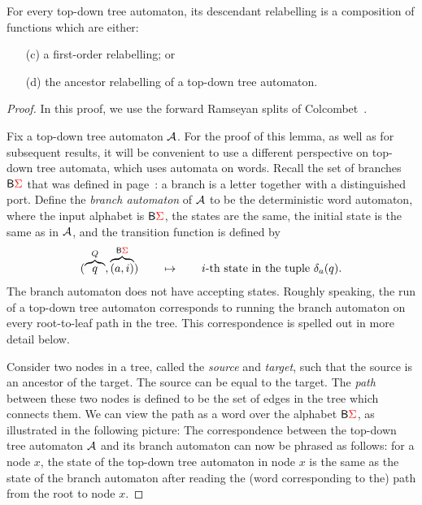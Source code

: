 \begin{lemma}\label{lem:reduce-descendant-to-ancestor}
    For every top-down tree automaton, its descendant relabelling is  a composition of functions which are either:
    \begin{itemize}
        \item[(c)] a first-order relabelling; or 
        \item[(d)] the ancestor relabelling of a  top-down tree automaton.
    \end{itemize}
\end{lemma}
\begin{proof} In this proof, we use the forward Ramseyan splits  of Colcombet~\cite{colcombetCombinatorialTheoremTrees2007}.

    Fix a top-down tree automaton ${\mathcal A}$. 
      For the proof of this lemma, as well as for subsequent results, it will be convenient to use a different perspective on top-down tree automata, which uses automata on words. Recall the set of branches $\mathsf{B} {\color{red}{\Sigma}}$ that was defined in page~\pageref{page:branches}: a branch is a letter together with a distinguished port. Define the \emph{branch automaton} of ${\mathcal A}$ to be the deterministic word automaton, where the input alphabet is $\mathsf{B} {\color{red}{\Sigma}}$, the states are the same, the initial state is the same as in ${\mathcal A}$, and the transition function is defined by 
    \begin{align*}
    (\overbrace q^{Q}, \overbrace{(a,i)}^{\mathsf{B} {\color{red}{\Sigma}}}) \qquad \mapsto \qquad \text{$i$-th state in the tuple $\delta_a(q)$.}
    \end{align*}
    The branch automaton does not have accepting states.  Roughly speaking, the run of a top-down tree automaton corresponds to running the branch automaton on every root-to-leaf path in the tree. This correspondence is spelled out in more detail below.

    Consider two nodes in a tree, called the \emph{source} and \emph{target}, such that the source is an ancestor of the target. The source can be equal to the target. The \emph{path} between these two nodes is defined to be the set of edges in the tree which connects them. We can view the path as a word over the alphabet $\mathsf{B} {\color{red}{\Sigma}}$, as illustrated in the following picture:
    The correspondence between the top-down tree automaton ${\mathcal A}$ and its  branch automaton can now be phrased as follows: for a node $x$, the state of the top-down tree automaton in node $x$ is the same as the state of the branch automaton after reading the (word corresponding to the) path from the root to node $x$.  


\end{proof}
